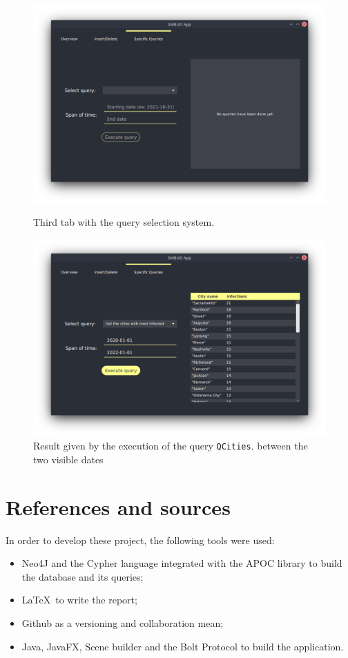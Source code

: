 \documentclass[12pt, a4paper]{article}
\begin{document}
\begin{figure}[h]
        \centering

        \includegraphics[width=.8\linewidth]{app_3.png}
        \caption*{Third tab with the query selection system.} %

        \includegraphics[width=.8\linewidth]{app_4.png}
        \caption*{Result given by the execution of the query 
            \texttt{QCities}. between the two visible dates} %
\end{figure}

\setlength\abovecaptionskip{0cm} %

\clearpage %

\section{References and sources}

In order to develop these project, the following tools were used:

\begin{itemize}
    \item Neo4J and the Cypher language integrated with the APOC library 
        to build the database and its queries;
    \item \LaTeX~to write the report;
    \item Github as a versioning and collaboration mean;
    \item Java, JavaFX, Scene builder and the Bolt Protocol to build 
        the application.
\end{itemize}

\clearpage
\end{document}
